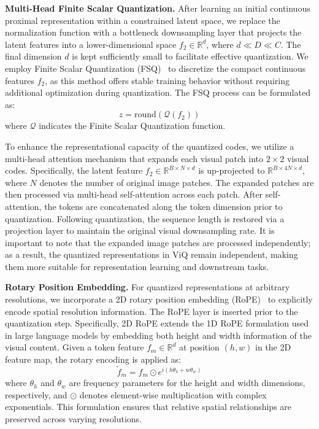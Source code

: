 \documentclass{llmxive}
\providecommand{\paragrapha}[1]{\par\addvspace{0.45em}\noindent\textbf{#1}}
\begin{document}
\paragrapha{Multi-Head Finite Scalar Quantization. }After learning an initial continuous proximal representation within a constrained latent space, we replace the normalization function with a bottleneck downsampling layer that projects the latent features into a lower-dimensional space \( f_2 \in \mathbb{R}^d \), where \( d \ll D \ll C \). The final dimension \( d \) is kept sufficiently small to facilitate effective quantization. We employ Finite Scalar Quantization (FSQ)~\cite{mentzerfinite} to discretize the compact continuous features \( f_2 \), as this method offers stable training behavior without requiring additional optimization during quantization. The FSQ process can be formulated as:
\begin{equation}
z = \text{round}(\mathcal{Q}(f_2))
\end{equation}
where $\mathcal{Q}$ indicates the Finite Scalar Quantization function.

To enhance the representational capacity of the quantized codes, we utilize a multi-head attention mechanism that expands each visual patch into \( 2 \times 2 \) visual codes. Specifically, the latent feature \( f_2 \in \mathbb{R}^{B \times N \times d} \) is up-projected to \( \mathbb{R}^{B \times 4N \times d} \), where \( N \) denotes the number of original image patches. The expanded patches are then processed via multi-head self-attention across each patch. After self-attention, the tokens are concatenated along the token dimension prior to quantization. Following quantization, the sequence length is restored via a projection layer to maintain the original visual downsampling rate. It is important to note that the expanded image patches are processed independently; as a result, the quantized representations in ViQ remain independent, making them more suitable for representation learning and downstream tasks.

\paragrapha{Rotary Position Embedding. }For quantized representations at arbitrary resolutions, we incorporate a 2D rotary position embedding (RoPE)~\cite{su2024roformer} to explicitly encode spatial resolution information. The RoPE layer is inserted prior to the quantization step. Specifically, 2D RoPE extends the 1D RoPE formulation used in large language models by embedding both height and width information of the visual content. Given a token feature \( f_m \in \mathbb{R}^d \) at position \( (h, w) \) in the 2D feature map, the rotary encoding is applied as:
\begin{equation}
\tilde{f}_m = f_m \odot e^{i (h \theta_h + w \theta_w)}
\end{equation}
where \( \theta_h \) and \( \theta_w \) are frequency parameters for the height and width dimensions, respectively, and \( \odot \) denotes element-wise multiplication with complex exponentials. This formulation ensures that relative spatial relationships are preserved across varying resolutions.
\end{document}
